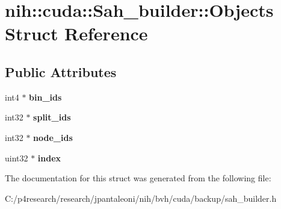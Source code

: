 \hypertarget{structnih_1_1cuda_1_1_sah__builder_1_1_objects}{
\section{nih\-:\-:cuda\-:\-:\-Sah\-\_\-builder\-:\-:\-Objects \-Struct \-Reference}
\label{structnih_1_1cuda_1_1_sah__builder_1_1_objects}
}
\subsection*{\-Public \-Attributes}
\begin{DoxyCompactItemize}
\item 
\hypertarget{structnih_1_1cuda_1_1_sah__builder_1_1_objects_ad038bc26a4e4ca433e2c255c05de038c}{
int4 $\ast$ {\bfseries bin\-\_\-ids}}
\label{structnih_1_1cuda_1_1_sah__builder_1_1_objects_ad038bc26a4e4ca433e2c255c05de038c}

\item 
\hypertarget{structnih_1_1cuda_1_1_sah__builder_1_1_objects_a50ae2705e3a3d61fd738f04862a18620}{
int32 $\ast$ {\bfseries split\-\_\-ids}}
\label{structnih_1_1cuda_1_1_sah__builder_1_1_objects_a50ae2705e3a3d61fd738f04862a18620}

\item 
\hypertarget{structnih_1_1cuda_1_1_sah__builder_1_1_objects_ac7057ed134798b2d824b16a414fbbad0}{
int32 $\ast$ {\bfseries node\-\_\-ids}}
\label{structnih_1_1cuda_1_1_sah__builder_1_1_objects_ac7057ed134798b2d824b16a414fbbad0}

\item 
\hypertarget{structnih_1_1cuda_1_1_sah__builder_1_1_objects_aac134a77600ec2b67629622dbe334ae1}{
uint32 $\ast$ {\bfseries index}}
\label{structnih_1_1cuda_1_1_sah__builder_1_1_objects_aac134a77600ec2b67629622dbe334ae1}

\end{DoxyCompactItemize}


\-The documentation for this struct was generated from the following file\-:\begin{DoxyCompactItemize}
\item 
\-C\-:/p4research/research/jpantaleoni/nih/bvh/cuda/backup/sah\-\_\-builder.\-h\end{DoxyCompactItemize}
